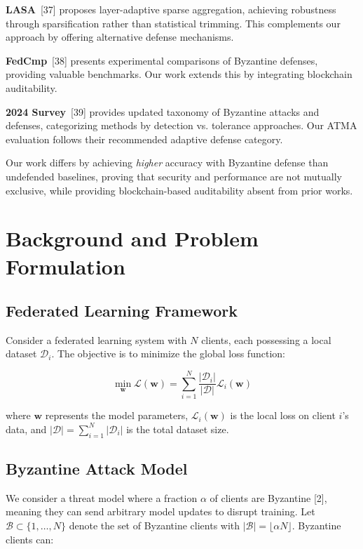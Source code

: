 \documentclass[12pt,a4paper,onecolumn]{article}
\begin{document}
\textbf{LASA}~[37] proposes layer-adaptive sparse aggregation, achieving robustness through sparsification rather than statistical trimming. This complements our approach by offering alternative defense mechanisms.

\textbf{FedCmp}~[38] presents experimental comparisons of Byzantine defenses, providing valuable benchmarks. Our work extends this by integrating blockchain auditability.

\textbf{2024 Survey}~[39] provides updated taxonomy of Byzantine attacks and defenses, categorizing methods by detection vs. tolerance approaches. Our ATMA evaluation follows their recommended adaptive defense category.

Our work differs by achieving \textit{higher} accuracy with Byzantine defense than undefended baselines, proving that security and performance are not mutually exclusive, while providing blockchain-based auditability absent from prior works.

\section{Background and Problem Formulation}
\label{sec:background}

\subsection{Federated Learning Framework}

Consider a federated learning system with $N$ clients, each possessing a local dataset $\mathcal{D}_i$. The objective is to minimize the global loss function:

\begin{equation}
\min_{\mathbf{w}} \mathcal{L}(\mathbf{w}) = \sum_{i=1}^{N} \frac{|\mathcal{D}_i|}{|\mathcal{D}|} \mathcal{L}_i(\mathbf{w})
\label{eq:global_loss}
\end{equation}

where $\mathbf{w}$ represents the model parameters, $\mathcal{L}_i(\mathbf{w})$ is the local loss on client $i$'s data, and $|\mathcal{D}| = \sum_{i=1}^{N} |\mathcal{D}_i|$ is the total dataset size.

\subsection{Byzantine Attack Model}

We consider a threat model where a fraction $\alpha$ of clients are Byzantine [2], meaning they can send arbitrary model updates to disrupt training. Let $\mathcal{B} \subset \{1, \ldots, N\}$ denote the set of Byzantine clients with $|\mathcal{B}| = \lfloor \alpha N \rfloor$. Byzantine clients can:
\end{document}
